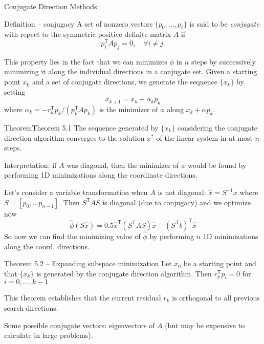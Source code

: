 \documentclass{beamer}
\newcommand{\tran}{\mathsf{T}}
\begin{document}
\begin{frame}[allowframebreaks]{Conjugate Direction Methods}

	\begin{block}{Definition -- conjugacy}
		A set of nonzero vectors $\{p_0,\ldots,p_\ell\}$ is said to be \emph{conjugate} with repect to the symmetric positive definite matrix $A$ if
		\[
			p_i^\tran A p_j = 0,\quad \forall i \neq j.
		\]
	\end{block}
	
	This property lies in the fact that we can minimizes $\phi$ in $n$ steps by successively minimizing it along the individual directions in a conjugate set. Given a starting point $x_0$ and a set of conjugate directions, we generate the sequence $\{x_k\}$ by setting
	\[
		x_{k+1} = x_k + \alpha_k p_k
	\]
	where $\alpha_k = -r_k^\tran p_k/(p_k^\tran A p_k)$ is the minimizer of $\phi$ along $x_k + \alpha p_k$.
	
	\vspace{0.5cm}
	
	\begin{block}{Theorem}{Theorem 5.1}
		The sequence generated by $\{x_k\}$ considering the conjugate direction algorithm converges to the solution $x^*$ of the linear system in at most $n$ steps.
	\end{block}
	
	Interpretation: if $A$ was diagonal, then the minimizer of $\phi$ would be found by performing 1D minimizations along the coordinate directions. 
	
	Let's consider a variable transformation when $A$ is not diagonal: $\hat{x} = S^{-1}x $ where $S=[p_0,\ldots p_{n-1}]$. Then $S^\tran A S$ is diagonal (due to conjugacy) and we optimize now 
	\[
		\hat{\phi}(S\hat{x}) = 0.5 \hat{x}^\tran (S^\tran A S ) \hat{x} - (S^\tran b)^\tran \hat{x}
	\] 
	So now we can find the minimizing value of $\hat{\phi}$ by performing $n$ 1D minimizations along the coord. directions.
	
	\begin{block}{Theorem 5.2 -- Expanding subspace minimization}
	Let $x_0$ be a starting point and that $\{x_k\}$ is generated by the conjugate direction algorithm. Then $r_k^\tran p_i =0$ for $i=0,\ldots,k-1$
	\end{block} 
	This theorem establishes that the current residual $r_k$ is orthogonal to all previous search directions.
	
	Some possible conjugate vectors: eigenvectors of $A$ (but may be expensive to calculate in large problems). 

\end{frame}
\end{document}
